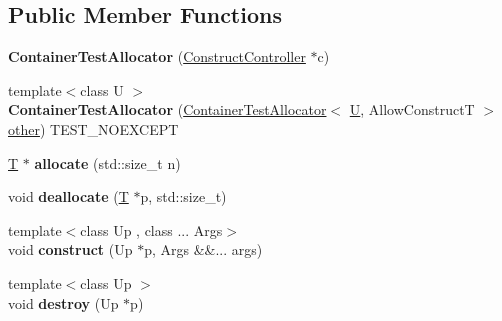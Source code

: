 \subsection*{Public Member Functions}
\begin{DoxyCompactItemize}
\item 
\mbox{\label{class_container_test_allocator_aee9f84ebd1d9523e87f4a34dc2367d06}} 
{\bfseries Container\+Test\+Allocator} (\mbox{\hyperlink{struct_allocator_construct_controller}{Construct\+Controller}} $\ast$c)
\item 
\mbox{\label{class_container_test_allocator_a0013b8d5dda254e70449115c9fc78b75}} 
{\footnotesize template$<$class U $>$ }\\{\bfseries Container\+Test\+Allocator} (\mbox{\hyperlink{class_container_test_allocator}{Container\+Test\+Allocator}}$<$ \mbox{\hyperlink{union_u}{U}}, Allow\+ConstructT $>$ \mbox{\hyperlink{structother}{other}}) T\+E\+S\+T\+\_\+\+N\+O\+E\+X\+C\+E\+PT
\item 
\mbox{\label{class_container_test_allocator_a64d6beb960b76b0779a9d1f04b0301cb}} 
\mbox{\hyperlink{struct_t}{T}} $\ast$ {\bfseries allocate} (std\+::size\+\_\+t n)
\item 
\mbox{\label{class_container_test_allocator_a1eab21414871bf309b23535cb7c771dd}} 
void {\bfseries deallocate} (\mbox{\hyperlink{struct_t}{T}} $\ast$p, std\+::size\+\_\+t)
\item 
\mbox{\label{class_container_test_allocator_a0a350254bf646da730408412e9045d31}} 
{\footnotesize template$<$class Up , class ... Args$>$ }\\void {\bfseries construct} (Up $\ast$p, Args \&\&... args)
\item 
\mbox{\label{class_container_test_allocator_a62ba8237c3261d098e27ff1f0ab65f43}} 
{\footnotesize template$<$class Up $>$ }\\void {\bfseries destroy} (Up $\ast$p)
\end{DoxyCompactItemize}
